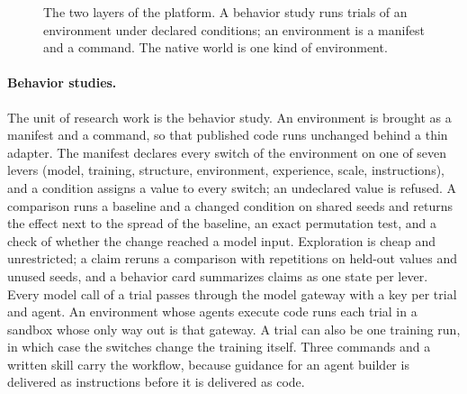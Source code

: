 \documentclass[11pt,a4paper]{article}
\begin{document}
\begin{figure}[tbp]
\caption{The two layers of the platform. A behavior study runs trials of an environment under declared
conditions; an environment is a manifest and a command. The native world is one kind of environment.}
\label{fig:architecture}
\end{figure}

\paragraph{Behavior studies.} The unit of research work is the behavior study. An environment is brought
as a manifest and a command, so that published code runs unchanged behind a thin adapter. The manifest
declares every switch of the environment on one of seven levers (model, training, structure, environment,
experience, scale, instructions), and a condition assigns a value to every switch; an undeclared value is
refused. A comparison runs a baseline and a changed condition on shared seeds and returns the effect next
to the spread of the baseline, an exact permutation test, and a check of whether the change reached a model
input. Exploration is cheap and unrestricted; a claim reruns a comparison with repetitions on held-out
values and unused seeds, and a behavior card summarizes claims as one state per lever. Every model call of
a trial passes through the model gateway with a key per trial and agent. An environment whose agents
execute code runs each trial in a sandbox whose only way out is that gateway. A trial can also be one
training run, in which case the switches change the training itself. Three commands and a written skill
carry the workflow, because guidance for an agent builder is delivered as instructions before it is
delivered as code.
\end{document}
